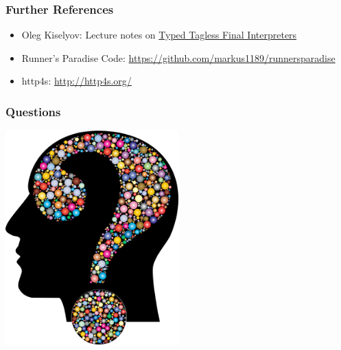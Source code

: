 \documentclass{beamer}
\begin{document}
\begin{frame}
  \frametitle{Further References}
  \begin{itemize}
  \item Oleg Kiselyov: Lecture notes on
    \href{http://okmij.org/ftp/tagless-final/course/lecture.pdf}{Typed
      Tagless Final Interpreters}
  \item Runner's Paradise Code:
    \url{https://github.com/markus1189/runnersparadise}
  \item http4s: \url{http://http4s.org/}
  \end{itemize}
\end{frame}

\begin{frame}
  \frametitle{Questions}
  \begin{center}
    \includegraphics[width=0.5\textwidth]{../pics/questions.png}
  \end{center}
\end{frame}
\end{document}
